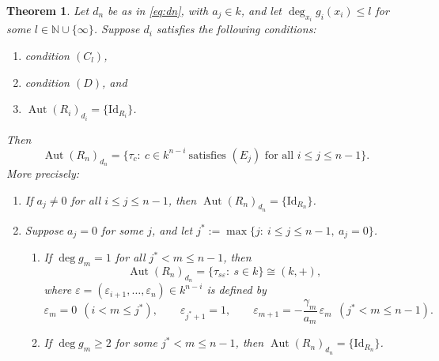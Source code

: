 \documentclass[11pt]{amsart}
\newtheorem{theorem}{Theorem}[section]
\theoremstyle{definition}
\theoremstyle{remark}
\numberwithin{equation}{theorem}
\newcommand{\Aut}{\operatorname{Aut}}
\newcommand{\N}{\mathbb{N}}
\newcommand{\id}{\mathrm{Id}}
\begin{document}
\begin{theorem}\label{thm:main}
Let $d_n$ be as in \eqref{eq:dn}, with $a_j\in k$, and let $\deg_{x_i}g_i(x_i)\le l$ for some
$l\in\N\cup\{\infty\}$. Suppose $d_i$ satisfies the following conditions:
\begin{enumerate}[label=\textup{(\roman*)}]
\item condition $(C_l)$,
\item condition $(D)$, and
\item $\Aut(R_i)_{d_i}=\{\id_{R_i}\}$.
\end{enumerate}
Then
\[
\Aut(R_n)_{d_n}=\{\tau_c:\ c\in k^{n-i}\ \text{satisfies } (E_j) \text{ for all } i\le j\le n-1\}.
\]
More precisely:
\begin{enumerate}[label=\textup{(\alph*)}]
\item If $a_j\neq0$ for all $i\le j\le n-1$, then $\Aut(R_n)_{d_n}=\{\id_{R_n}\}$.
\item Suppose $a_j=0$ for some $j$, and let $j^*:=\max\{j:\ i\le j\le n-1,\ a_j=0\}$.
\begin{enumerate}[label=\textup{(b\arabic*)}]
\item If $\deg g_m=1$ for all $j^*<m\le n-1$, then
\[
\Aut(R_n)_{d_n}=\{\tau_{s\varepsilon}:\ s\in k\}\cong(k,+),
\]
where $\varepsilon=(\varepsilon_{i+1},\dots,\varepsilon_n)\in k^{n-i}$ is defined by
\[
\varepsilon_m=0\ \ (i<m\le j^*),\qquad \varepsilon_{j^*+1}=1,\qquad
\varepsilon_{m+1}=-\frac{\gamma_m}{a_m}\,\varepsilon_m\ \ (j^*<m\le n-1).
\]
\item If $\deg g_m\ge2$ for some $j^*<m\le n-1$, then $\Aut(R_n)_{d_n}=\{\id_{R_n}\}$.
\end{enumerate}
\end{enumerate}
\end{theorem}
\end{document}
